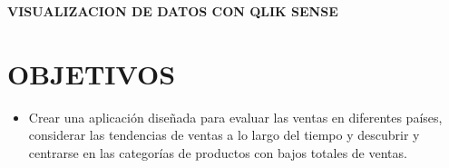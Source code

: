 \documentclass[12pt,letterpaper]{article}
\begin{document}
    \newpage
    \begin{LARGE}
        \begin{center}
            \textbf{VISUALIZACION DE DATOS CON QLIK SENSE} \\
        \end{center}
    \end{LARGE}
    \section{OBJETIVOS}
    \begin{itemize}
        \item Crear una aplicación diseñada para evaluar las ventas en diferentes países, considerar las tendencias de ventas a lo largo del tiempo y descubrir y centrarse en las categorías de productos con bajos totales de ventas.
    \end{itemize}
\end{document}
